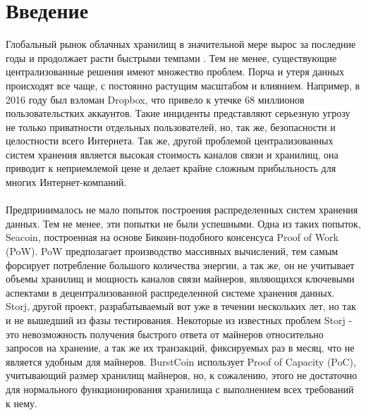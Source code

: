 \documentclass[10pt,a4paper]{article}
\begin{document}
\section{Введение} %
\vspace{-0.5em}
Глобальный рынок облачных хранилищ в значительной мере вырос за последние годы и продолжает расти быстрыми темпами . Тем не менее, существующие централизованные решения имеют множество проблем. Порча и утеря данных происходят все чаще, с постоянно растущим масштабом и влиянием. Например, в 2016 году был взломан Dropbox, что привело к утечке 68 миллионов пользовательстких аккаунтов. Такие инциденты представляют серьезную угрозу не только приватности отдельных пользователей, но, так же, безопасности и целостности всего Интернета. Так же, другой проблемой централизованных систем хранения является высокая стоимость каналов связи и хранилищ, она приводит к неприемлемой цене и делает крайне сложным прибыльность для многих Интернет-компаний.
\vspace{-0.5em}
\\ \\Предпринималось не мало попыток построения распределенных систем хранения данных. Тем не менее, эти попытки не были успешными. Одна из таких попыток, Seacoin, построенная на основе Бикоин-подобного консенсуса Proof of Work (PoW). PoW предполагает производство массивных вычислений, тем самым форсирует потребление большого количества энергии, а так же, он не учитывает объемы хранилищ и мощность каналов связи майнеров, являющихся ключевыми аспектами в децентрализованной распределенной системе хранения данных. Storj, другой проект, разрабатываемый вот уже в течении нескольких лет, но так и не вышедший из фазы тестирования. Некоторые из известных проблем Storj - это невозможность получения быстрого ответа от майнеров относительно запросов на хранение, а так же их транзакций, фиксируемых раз в месяц, что не является удобным для майнеров. BurstCoin использует Proof of Capacity (PoC), учитывающий размер хранилищ майнеров, но, к сожалению, этого не достаточно для нормального функционирования хранилища с выполнением всех требований к нему.
\vspace{-0.5em}
\end{document}
